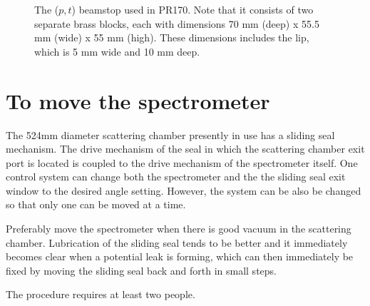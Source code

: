 \documentclass[11pt]{report}
\begin{document}
\begin{figure}[!ht]
\centerline{\vspace{0cm}\hspace{0cm}
}
\centering
\caption{The ($p,t$) beamstop used in PR170. 
Note that it consists of two separate brass blocks, each with dimensions 70 mm (deep) x 55.5 mm (wide) x 55 mm (high).
These dimensions includes the lip, which is 5 mm wide and 10 mm deep.}
\label{fig:internal-beamstop-2}
\end{figure} 



\section {To move the spectrometer}

The 524mm diameter scattering chamber presently in use has a sliding seal mechanism.
The drive mechanism of the seal in which the scattering chamber exit port is 
located is coupled to the drive mechanism of the spectrometer itself.
One control system can change both the spectrometer and the the sliding seal exit window to the desired angle setting. However, the system can be also be changed so that only 
one can be moved at a time.

\bigskip
{}

\bigskip
Preferably move the spectrometer when there is good vacuum in the scattering chamber.
Lubrication of the sliding seal tends to be better 
and it immediately becomes clear when a potential leak is forming, which can then
immediately be fixed by moving the sliding seal back and forth in small steps.

The procedure requires at least two people. 
\end{document}
